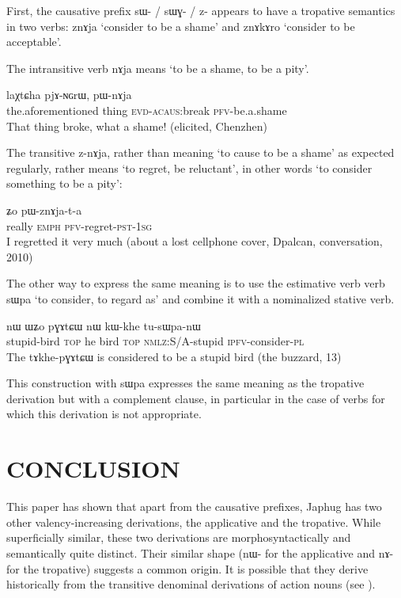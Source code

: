 \documentclass[oldfontcommands,twoside,a4paper,12pt]{article}
\newcommand{\ipa}[1]{{\phon \mbox{#1}}} %
\newcommand{\acaus}{\textsc{acaus}}
\newcommand{\aor}{\textsc{pfv}}
\newcommand{\emphat}{\textsc{emph}}
\newcommand{\evd}{\textsc{evd}}
\newcommand{\ipf}{\textsc{ipfv}}
\newcommand{\nmlz}{\textsc{nmlz}}
\newcommand{\pl}{\textsc{pl}}
\newcommand{\pst}{\textsc{pst}}
\newcommand{\sg}{\textsc{sg}}
\newcommand{\topic}{\textsc{top}}
\begin{document}
 
 First, the causative  prefix \ipa{sɯ-} / \ipa{sɯɣ-} / \ipa{z-} appears to have a tropative semantics in two verbs: \ipa{znɤja} `consider to be a shame' and \ipa{znɤkɤro} `consider to be acceptable'.

The intransitive verb \ipa{nɤja} means `to be a shame, to be a pity'.
  \begin{exe}
\ex
\gll \ipa{iɕqha} 	\ipa{laχtɕha} 	\ipa{pjɤ-ɴɢrɯ,} 	\ipa{pɯ-nɤja} \\
the.aforementioned thing \evd{}-\acaus{}:break \aor{}-be.a.shame \\
  \glt  That thing broke, what a shame! (elicited, Chenzhen)
   \end{exe}

   The transitive \ipa{z-nɤja}, rather than meaning `to cause to be a shame' as expected regularly, rather means `to regret, be reluctant', in other words `to consider something to be a pity':
   
     \begin{exe}
\ex 
\gll \ipa{wuma} 	\ipa{ʑo} 	\ipa{pɯ-znɤja-t-a}  \\
really \emphat{} \aor{}-regret-\pst{}-1\sg{} \\
  \glt  I regretted it very much (about a lost cellphone cover, Dpalcan, conversation, 2010)
   \end{exe}
   
 
   
  The other way to express the same meaning is to use the estimative verb  
  verb \ipa{sɯpa} `to consider, to regard as' and combine it with a nominalized stative verb.

     \begin{exe}
\ex 
\gll \ipa{tɤkhe-pɣɤtɕɯ} 	\ipa{nɯ} 	\ipa{ɯʑo} 	\ipa{pɣɤtɕɯ} 	\ipa{nɯ} 	\ipa{kɯ-khe} 	\ipa{tu-sɯpa-nɯ} \\
stupid-bird \topic{} he bird \topic{} \nmlz{}:S/A-stupid \ipf{}-consider-\pl{} \\
 \glt The \ipa{tɤkhe-pɣɤtɕɯ} is considered to be a stupid bird (the buzzard, 13)
   \end{exe}
 
 This construction with  \ipa{sɯpa} expresses the same meaning as the tropative derivation but with a complement clause, in particular in the case of verbs for which this derivation is not appropriate.
  
 \section{\uppercase{conclusion}}
 This paper has shown that apart from the causative prefixes, Japhug has two other valency-increasing derivations, the applicative and the tropative. While superficially similar, these two derivations are morphosyntactically and semantically quite distinct. Their similar shape (\ipa{nɯ-} for the applicative and \ipa{nɤ-} for the tropative) suggests a   common origin. It is possible that they derive historically from the transitive denominal derivations of action nouns (see \citealt{jacques14antipassive}).
 
\end{document}
